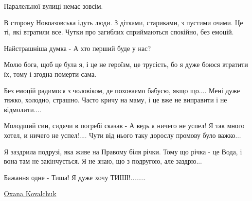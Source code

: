 Паралельної вулиці немає зовсім. 

В сторону Новоазовська ідуть люди. З дітками, стариками, з пустими очами. Це
ті, які втратили все. Чутки про загиблих сприймаються спокійно, без емоцій.

Найстрашніша думка - А хто перший буде у нас?

Молю бога, щоб це була я, і це не героїзм, це трусість, бо я дуже боюся втратити
їх, тому і згодна померти сама.

Без емоцій радимося з чоловіком, де поховаємо бабусю, якщо що.... Мені дуже
тяжко, холодно, страшно. Часто кричу на маму, і це вже не виправити і не
відмолити....

Молодший син, сидячи в погребі сказав - А ведь я ничего не успел! Я так много
хотел, и ничего не успел!.... Чути від нього таку дорослу промову було важко...

Я заздрила подрузі, яка живе на Правому біля річки. Тому що річка - це Вода, і
вона там не закінчується. Я не знаю, що з подругою, але заздрю...

Бажання одне - Тиша! Я дуже хочу ТИШІ!........

\href{https://www.facebook.com/profile.php?id=100070393907205}{Oxana Kovalchuk}


